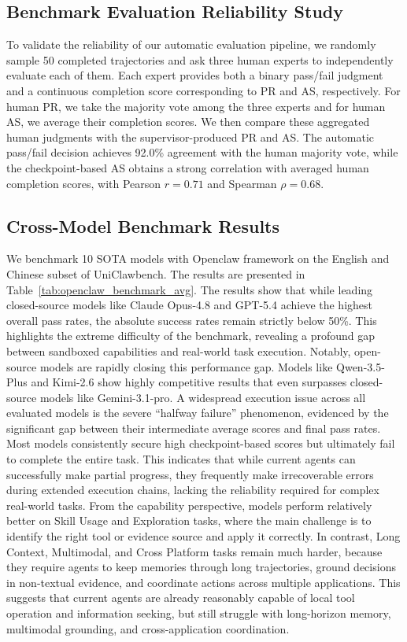 \vspace{-3pt}
\subsection{Benchmark Evaluation Reliability Study}

To validate the reliability of our automatic evaluation pipeline, we randomly sample 50 completed trajectories and ask three human experts to independently evaluate each of them. Each expert provides both a binary pass/fail judgment and a continuous completion score corresponding to PR and AS, respectively. For human PR, we take the majority vote among the three experts and for human AS, we average their completion scores. We then compare these aggregated human judgments with the supervisor-produced PR and AS. The automatic pass/fail decision achieves 92.0\% agreement with the human majority vote, while the checkpoint-based AS obtains a strong correlation with averaged human completion scores, with Pearson
$r=0.71$ and Spearman $\rho=0.68$.


\subsection{Cross-Model Benchmark Results}
We benchmark 10 SOTA models with Openclaw framework on the English and Chinese subset of UniClawbench. The results are presented in Table~\ref{tab:openclaw_benchmark_avg}. The results show that while leading closed-source models like Claude Opus-4.8 and GPT-5.4 achieve the highest overall pass rates, the absolute success rates remain strictly below 50\%. This highlights the extreme difficulty of the benchmark, revealing a profound gap between sandboxed capabilities and real-world task execution. Notably, open-source models are rapidly closing this performance gap. Models like Qwen-3.5-Plus and Kimi-2.6 show highly competitive results that even surpasses closed-source models like Gemini-3.1-pro. A widespread execution issue across all evaluated models is the severe ``halfway failure'' phenomenon, evidenced by the significant gap between their intermediate average scores and final pass rates. Most models consistently secure high checkpoint-based scores but ultimately fail to complete the entire task. This indicates that while current agents can successfully make partial progress, they frequently make irrecoverable errors during extended execution chains, lacking the reliability required for complex real-world tasks.  From the capability perspective, models perform relatively better on Skill Usage and Exploration tasks, where the main challenge is to identify the right tool or evidence source and apply it correctly. In contrast, Long Context, Multimodal, and Cross Platform tasks remain much harder, because they require agents to keep memories through long trajectories, ground decisions in non-textual evidence, and coordinate actions across multiple applications. This suggests that current
agents are already reasonably capable of local tool operation and information seeking, but still struggle with long-horizon memory, multimodal grounding, and cross-application coordination.

